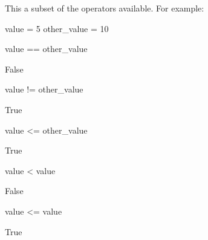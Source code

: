 This a subset of the operators available.
For example:




\begin{pyin}
value = 5
other_value = 10

value == other_value
\end{pyin}





\begin{raw}
False
\end{raw}







\begin{pyin}
value != other_value
\end{pyin}





\begin{raw}
True
\end{raw}







\begin{pyin}
value <= other_value
\end{pyin}





\begin{raw}
True
\end{raw}







\begin{pyin}
value < value
\end{pyin}





\begin{raw}
False
\end{raw}







\begin{pyin}
value <= value
\end{pyin}





\begin{raw}
True
\end{raw}







